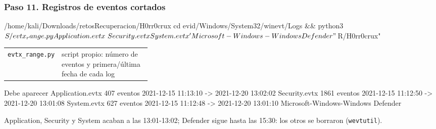 \documentclass[11pt,a4paper]{article}
\begin{document}
\subsubsection*{Paso 11. Registros de eventos cortados}
\begin{comando}{/home/kali/Downloads/retosRecuperacion/H0rr0crux}
cd evid/Windows/System32/winevt/Logs && python3 $S/evtx_range.py Application.evtx \
  Security.evtx System.evtx 'Microsoft-Windows-Windows Defender%
  "$R/H0rr0crux"
\end{comando}
\begin{tcolorbox}[enhanced, breakable, colback=gray!3, colframe=gray!35, boxrule=0.3pt, arc=1pt, left=4pt, right=4pt, top=2pt, bottom=2pt, fonttitle=\sffamily\scriptsize\bfseries, coltitle=black!70, colbacktitle=gray!10, title={Qué hace cada parte}, attach title to upper, before skip=2pt, after skip=4pt, fontupper=\small]
\par{\renewcommand{\arraystretch}{1.12}\begin{tabularx}{\linewidth}{@{}>{\raggedright\arraybackslash}p{0.33\linewidth}>{\raggedright\arraybackslash}X@{}}
\texttt{evtx\_\allowbreak{}range.py} & script propio: número de eventos y primera/última fecha de cada log \\
\end{tabularx}}
\end{tcolorbox}
\begin{salida}{Debe aparecer}
Application.evtx                                 407 eventos   2021-12-15 11:13:10  ->  2021-12-20 13:02:02
Security.evtx                                   1861 eventos   2021-12-15 11:12:50  ->  2021-12-20 13:01:08
System.evtx                                      627 eventos   2021-12-15 11:12:48  ->  2021-12-20 13:01:10
Microsoft-Windows-Windows Defender%
\end{salida}
\begin{nota}Application, Security y System acaban a las 13:01-13:02; Defender sigue hasta las 15:30: los otros se borraron (\texttt{wevtutil}).\end{nota}
\end{document}
